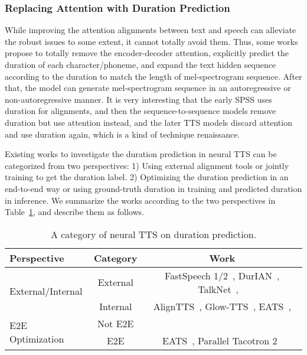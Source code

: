 \documentclass{article}
\begin{document}
\subsubsection{Replacing Attention with Duration Prediction} 
\label{sec_advanced_robust_duration}
While improving the attention alignments between text and speech can alleviate the robust issues to some extent, it cannot totally avoid them. Thus, some works~\cite{ren2019fastspeech,yu2020durian,kim2020glow,donahue2020end} propose to totally remove the encoder-decoder attention, explicitly predict the duration of each character/phoneme, and expand the text hidden sequence according to the duration to match the length of mel-spectrogram sequence. After that, the model can generate mel-spectrogram sequence in an autoregressive or non-autoregressive manner. It is very interesting that the early SPSS uses duration for alignments, and then the sequence-to-sequence models remove duration but use attention instead, and the later TTS models discard attention and use duration again, which is a kind of technique renaissance. 

Existing works to investigate the duration prediction in neural TTS can be categorized from two perspectives: 1) Using external alignment tools or jointly training to get the duration label. 2) Optimizing the duration prediction in an end-to-end way or using ground-truth duration in training and predicted duration in inference. We summarize the works according to the two perspectives in Table~\ref{tab_robustness_duration}, and describe them as follows.


\begin{table}[h]
\small
	\caption{A category of neural TTS on duration prediction.}
	\centering
	\begin{tabular}{l | c | c }
		\toprule
	    Perspective & Category & Work  \\
		\midrule
		\multirow{2}{*}{External/Internal}  & External & FastSpeech 1/2~\cite{ren2019fastspeech,ren2021fastspeech}, DurIAN~\cite{yu2020durian}, TalkNet~\cite{beliaev2020talknet},
		~\cite{vainer2020speedyspeech,elias2020parallel,shen2020non}  \\
		& Internal & AlignTTS~\cite{zeng2020aligntts}, Glow-TTS~\cite{kim2020glow}, EATS~\cite{donahue2020end}, \cite{miao2020efficienttts,elias2021parallel} \\
		\midrule
	    \multirow{2}{*}{E2E Optimization} & Not E2E & ~\cite{ren2019fastspeech,vainer2020speedyspeech,beliaev2020talknet,ren2021fastspeech,yu2020durian,li2020robutrans,elias2020parallel,shen2020non,zeng2020aligntts,lim2020jdi,kim2020glow}  \\
	    & E2E & EATS~\cite{donahue2020end}, Parallel Tacotron 2~\cite{elias2021parallel} \\
		\bottomrule
	\end{tabular}
	\label{tab_robustness_duration}
\end{table}
\end{document}
